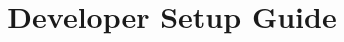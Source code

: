 \documentclass[a4paper,10pt]{article}
\title{Developer Setup Guide}
\author{}
\begin{document}
\maketitle

\begin{abstract}

\end{abstract}

\section{}
\end{document}
